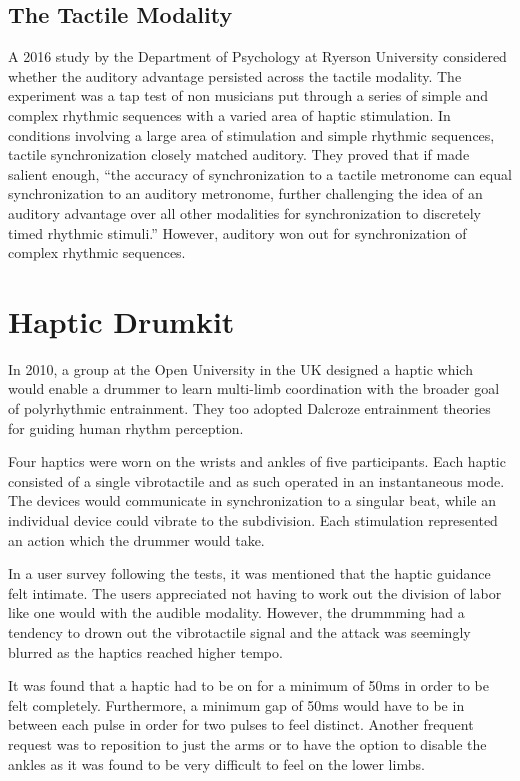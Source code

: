 \subsection{The Tactile Modality} \label{tactileModality}
A 2016 study by the Department of Psychology at Ryerson University considered whether the auditory advantage persisted across the tactile modality. The experiment was a tap test of non musicians put through a series of simple and complex rhythmic sequences with a varied area of haptic stimulation. In conditions involving a large area of stimulation and simple rhythmic sequences, tactile synchronization closely matched auditory. They proved that if made salient enough, “the accuracy of synchronization to a tactile metronome can equal synchronization to an auditory metronome, further challenging the idea of an auditory advantage over all other modalities for synchronization to discretely timed rhythmic stimuli.” However, auditory won out for synchronization of complex rhythmic sequences. ~\cite{ammirante2016synchronizing}

\section{Haptic Drumkit} \label{HD}
In 2010, a group at the Open University in the UK designed a haptic which would enable a drummer to learn multi-limb coordination with the broader goal of polyrhythmic entrainment. They too adopted Dalcroze entrainment theories for guiding human rhythm perception. 

Four haptics were worn on the wrists and ankles of five participants. Each haptic consisted of a single vibrotactile and as such operated in an instantaneous mode. The devices would communicate in synchronization to a singular beat, while an individual device could vibrate to the subdivision. Each stimulation represented an action which the drummer would take. \cite{holland2010feeling}

In a user survey following the tests, it was mentioned that the haptic guidance felt intimate. The users appreciated not having to work out the division of labor like one would with the audible modality. However, the drummming had a tendency to drown out the vibrotactile signal and the attack was seemingly blurred as the haptics reached higher tempo. 

It was found that a haptic had to be on for a minimum of 50ms in order to be felt completely. Furthermore, a minimum gap of 50ms would have to be in between each pulse in order for two pulses to feel distinct. Another frequent request was to reposition to just the arms or to have the option to disable the ankles as it was found to be very difficult to feel on the lower limbs.

